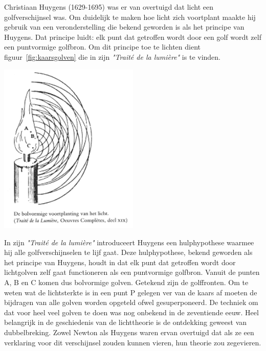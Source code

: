 \documentclass[../main.tex]{subfiles}
\begin{document}
Christiaan Huygens (1629-1695) was er van overtuigd dat licht een golfverschijnsel was. Om duidelijk te maken hoe licht zich voortplant maakte hij gebruik van een veronderstelling die bekend geworden is als het principe van Huygens. Dat principe luidt: elk punt dat getroffen wordt door een golf wordt zelf een puntvormige golfbron. Om dit principe toe te lichten dient figuur~\ref{fig:kaarsgolven} die in zijn \textit{"Trait\'e de la lumi\`ere"} is te vinden.


\begin{center}
\leavevmode
\includegraphics[width=0.5\textwidth]{./img/kaarsgolven.png}
\end{center}

In zijn \textit{"Trait\'e de la lumi\`ere"} introduceert Huygens een hulphypothese waarmee hij alle golfverschijnselen te lijf gaat. Deze hulphypothese, bekend geworden als het principe van Huygens, houdt in dat elk punt dat getroffen wordt door lichtgolven zelf gaat functioneren als een puntvormige golfbron. Vanuit de punten A, B en C komen dus bolvormige golven. Getekend zijn de golffronten.
Om te weten wat de lichtsterkte is in een punt P gelegen ver van de kaars af moeten de bijdragen van alle golven worden opgeteld ofwel gesuperponeerd. De techniek om dat voor heel veel golven te doen was nog onbekend in de zeventiende eeuw. 
Heel belangrijk in de geschiedenis van de lichttheorie is de ontdekking geweest van dubbelbreking. Zowel Newton als Huygens waren ervan overtuigd dat als ze een verklaring voor dit verschijnsel zouden kunnen vieren, hun theorie zou zegevieren. 
\end{document}
